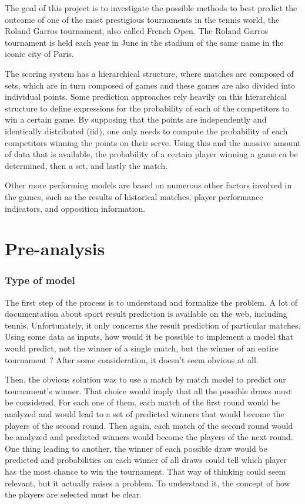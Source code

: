 \documentclass[12pt]{article}
\begin{document}
The goal of this project is to investigate the possible methods to best predict the outcome of one of the most prestigious tournaments in the tennis world, the Roland Garros tournament, also called French Open. The Roland Garros tournament is held each year in June in the stadium of the same name in the iconic city of Paris.

The scoring system has a hierarchical structure, where matches are composed of sets, which are in turn composed of games and these games are also divided into individual points.
Some prediction approaches rely heavily on this hierarchical structure to define expressions for the probability of each of the competitors to win a certain game.
By supposing that the points are independently and identically distributed (iid), one only needs to compute the probability of each competitors winning the points on their serve.
Using this and the massive amount of data that is available, the probability of a certain player winning a game ca be determined, then a set, and lastly the match.

Other more performing models are based on numerous other factors involved in the games, such as the results of historical matches, player performance indicators, and opposition information.


\section*{Pre-analysis}

\subsubsection*{Type of model}
The first step of the process is to understand and formalize the problem. A lot of documentation about sport result prediction is available on the web, including tennis. Unfortunately, it only concerns the result prediction of particular matches. Using some data as inputs, how would it be possible to implement a model that would predict, not the winner of a single match, but the winner of an entire tournament ? After some consideration, it doesn't seem obvious at all.

Then, the obvious solution was to use a match by match model to predict our tournament's winner. That choice would imply that all the possible draws must be considered. For each one of them, each match of the first round would be analyzed and would lead to a set of predicted winners that would become the players of the second round. Then again, each match of the second round would be analyzed and predicted winners would become the players of the next round. One thing leading to another, the winner of each possible draw would be predicted and probabilities on each winner of all draws could tell which player has the most chance to win the tournament. That way of thinking could seem relevant, but it actually raises a problem. To understand it, the concept of how the players are selected must be clear. 
\end{document}
